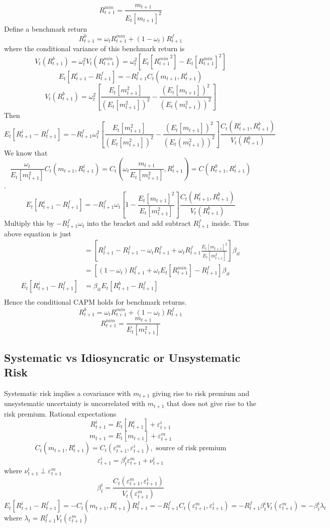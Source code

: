\documentclass[11pt, a4paper, oneside]{article}
\theoremstyle{definition}
\theoremstyle{proposition}
\theoremstyle{corollary}
\theoremstyle{lemma}
\theoremstyle{theorem}
\begin{document}
$$R_{t+1}^{min} = \frac{m_{t+1}}{E_t[m_{t+1}]^2}$$ 
Define a benchmark return $$R_{t+1}^b = \omega_t R_{t+1}^{min} + (1- \omega_t)R_{t+1}^f$$
where the conditional variance of this benchmark return is $$V_t(R_{t+1}^b) = \omega_t^2V_t(R_{t+1}^{min}) = \omega_t^2[E_t[{R_{t+1}^{min}}^2] - E_t[R_{t+1}^{min}]^2]$$
$$E_t[R_{t+1}^i - R_{t+1}^f] = -R_{t+1}^f C_t(m_{t+1}, R_{t+1}^i)$$
$$V_t(R_{t+1}^b) = \omega_t^2\left[\frac{E_t[m_{t+1}^2]}{(E_t[m_{t+1}^2])^2} - \frac{(E_t[m_{t+1}])^2}{(E_t(m_{t+1}^2))^2}\right]$$
Then
$$E_t[R_{t+1}^i - R_{t+1}^f] = -R_{t+1}^f \omega_t^2\left[\frac{E_t[m_{t+1}^2]}{(E_t[m_{t+1}^2])^2} - \frac{(E_t[m_{t+1}])^2}{(E_t(m_{t+1}^2))^2}\right] \frac{C_t(R_{t+1}^i, R_{t+1}^b)}{V_t(R_{t+1}^b)}$$
We know that
$$\frac{\omega_t}{E_t[m_{t+1}^2]} C_t(m_{t+1}, R_{t+1}^i) = C_t\left(\omega_t \frac{m_{t+1}}{E_t[m_{t+1}^2]}, R_{t+1}^i\right) = C(R_{t+1}^b, R_{t+1}^i)$$. 
$$E_t[R_{t+1}^i - R_{t+1}^f] = -R_{t+1}^f \omega_t\left[1- \frac{E_t[m_{t+1}]^2}{E_t[m_{t+1}^2]}\right]\frac{C_t(R_{t+1}^i, R_{t+1}^b)}{V_t(R_{t+1}^b)}$$
Multiply this by $-R_{t+1}^f\omega_t$ into the bracket and add subtract $R_{t+1}^f$ inside.
Thus above equation is just
\begin{align*}
&=\left[R_{t+1}^f - R_{t+1}^f - \omega_t R_{t+1}^f + \omega_tR_{t+1}^f\frac{E_t[m_{t+1}]^2}{E_t[m_{t+1}^2]}\right]\beta_{it}\\
&=\left[(1- \omega_t)R_{t+1}^f + \omega_t E_t[R_{t+1}^{min}] - R_{t+1}^f\right] \beta_{it}\\
E_t[R_{t+1}^i - R_{t+1}^f] &= \beta_{it}E_t[R_{t+1}^b - R_{t+1}^f]\\
\end{align*}
Hence the conditional CAPM holds for benchmark returns. 
$$R_{t +1}^b = \omega_t R_{t+1}^{min} + ( 1- \omega_t) R_{t+1}^f$$
$$R_{t+1}^{min} = \frac{m_{t+1}}{E_t[m_{t+1}^2]}$$

\subsection{Systematic vs Idiosyncratic or Unsystematic Risk}
Systematic risk implies a covariance with $m_{t+1}$ giving rise to risk premium and unsystematic uncertainty is uncorrelated with $m_{t+1}$ that does not give rise to the risk premium. Rational expectations 
$$R_{t+1}^i = E_t[R_{t+1}^i] + \varepsilon_{t+1}^i$$
$$m_{t+1} = E_t[m_{t+1}] + \varepsilon_{t+1}^m$$
$$C_t(m_{t+1}, R_{t+1}^i) = C_t(\varepsilon_{t+1}^m, \varepsilon_{t+1}^i), \text{ source of risk premium}$$
$$\varepsilon_{t+1}^i = \beta_t^i \varepsilon_{t+1}^m + \nu_{t+1}^i$$ 
where $\nu_{t+1}^i \perp \varepsilon_{t+1}^m$ 
$$\beta_t^i = \frac{C_t(\varepsilon_{t+1}^m, \varepsilon_{t+1}^i)}{V_t(\varepsilon_{t+1}^m)}$$
$$E_t[R_{t+1}^i - R_{t+1}^f] = - C_t(m_{t+1}, R_{t+1}^i)R_{t+1}^f = -R_{t+1}^f C_t(\varepsilon_{t+1}^m, \varepsilon_{t+1}^i) = -R_{t+1}^f \beta_t^i V_t(\varepsilon_{t+1}^m) = -\beta_t^i \lambda_t$$
where $\lambda_t = R_{t+1}^f  V_t(\varepsilon_{t+1}^m)$ 
\end{document}
